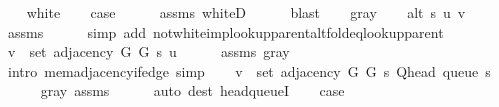 \begin{isabellebody}
\ \ \isamarkupfalse%
\ white\isanewline
\ \ \isamarkupfalse%
\ {\isacharquery}{\kern0pt}case\isanewline
\ \ \ \ \isamarkupfalse%
\ assms{\isacharparenleft}{\kern0pt}{}{\isacharparenright}{\kern0pt}\ whiteD\isanewline
\ \ \ \ \isamarkupfalse%
\ blast\isanewline
{}\isamarkupfalse%
\isanewline
\ \ \isamarkupfalse%
\ gray\isanewline
\ \ \isamarkupfalse%
\ {\isachardoublequoteopen}alt\ s\ u\ v{\isachardoublequoteclose}\isanewline
\ \ \ \ \isamarkupfalse%
\ assms{\isacharparenleft}{\kern0pt}{}{\isacharparenright}{\kern0pt}\isanewline
\ \ \ \ \isamarkupfalse%
\ {\isacharparenleft}{\kern0pt}simp\ add{\isacharcolon}{\kern0pt}\ not{\isacharunderscore}{\kern0pt}white{\isacharunderscore}{\kern0pt}imp{\isacharunderscore}{\kern0pt}lookup{\isacharunderscore}{\kern0pt}parent{\isacharunderscore}{\kern0pt}alt{\isacharunderscore}{\kern0pt}fold{\isacharunderscore}{\kern0pt}eq{\isacharunderscore}{\kern0pt}lookup{\isacharunderscore}{\kern0pt}parent{\isacharparenright}{\kern0pt}\isanewline
\ \ \isamarkupfalse%
\ {\isachardoublequoteopen}v\ {\isasymin}\ set\ {\isacharparenleft}{\kern0pt}adjacency\ G{}\ G{}\ s\ u{\isacharparenright}{\kern0pt}{\isachardoublequoteclose}\isanewline
\ \ \ \ \isamarkupfalse%
\ assms{\isacharparenleft}{\kern0pt}{}{\isacharparenright}{\kern0pt}\ gray\isanewline
\ \ \ \ \isamarkupfalse%
\ {\isacharparenleft}{\kern0pt}intro\ mem{\isacharunderscore}{\kern0pt}adjacency{\isacharunderscore}{\kern0pt}if{\isacharunderscore}{\kern0pt}edge{\isacharparenright}{\kern0pt}\ simp{\isacharplus}{\kern0pt}\isanewline
\ \ \isamarkupfalse%
\ {\isachardoublequoteopen}v\ {\isasymin}\ set\ {\isacharparenleft}{\kern0pt}adjacency\ G{}\ G{}\ s\ {\isacharparenleft}{\kern0pt}Q{\isacharunderscore}{\kern0pt}head\ {\isacharparenleft}{\kern0pt}queue\ s{\isacharparenright}{\kern0pt}{\isacharparenright}{\kern0pt}{\isacharparenright}{\kern0pt}{\isachardoublequoteclose}\isanewline
\ \ \ \ \isamarkupfalse%
\ gray\ assms{\isacharparenleft}{\kern0pt}{}{\isacharparenright}{\kern0pt}\isanewline
\ \ \ \ \isamarkupfalse%
\ {\isacharparenleft}{\kern0pt}auto\ dest{\isacharcolon}{\kern0pt}\ head{\isacharunderscore}{\kern0pt}queueI{\isacharunderscore}{\kern0pt}{}{\isacharparenright}{\kern0pt}\isanewline
\ \ \isamarkupfalse%
\ {\isacharquery}{\kern0pt}case\isanewline

\end{isabellebody}
